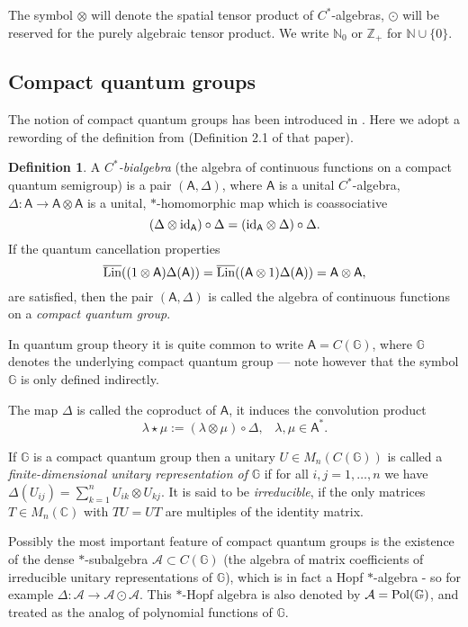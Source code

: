 \documentclass[12pt]{amsart}
\theoremstyle{definition}
\newtheorem{definition}[theorem]{Definition}
\theoremstyle{remark}
\numberwithin{equation}{section}
\begin{document}
The symbol $\otimes$ will denote the spatial tensor product of $C^*$-algebras,  $\odot$ will be reserved for the
purely algebraic tensor product. We write $\mathbb{N}_0$ or $\mathbb{Z}_+$ for $\mathbb{N}\cup \{0\}$.

\subsection{Compact quantum groups}

The notion of compact quantum groups has been introduced in \cite{woronowicz87}. Here we adopt a rewording of the 
definition from \cite{woronowicz98} (Definition 2.1 of that paper).

\begin{definition}
A \emph{$C^*$-bialgebra} (the algebra of continuous functions on a compact quantum semigroup) is a pair $(\mathsf{A}, \Delta)$, where
$\mathsf{A}$ is a unital $C^*$-algebra,
 $\Delta:\mathsf{A} \to \mathsf{A} \otimes \mathsf{A}$ is a unital,
 $*$-homomorphic map which is coassociative
\[ (\Delta \otimes \textup{id}_{\mathsf{A}})\circ \Delta = (\textup{id}_{\mathsf{A}} \otimes \Delta)
\circ\Delta.
\]
If the quantum cancellation properties
\[
\overline{{\rm Lin}}((1\otimes \mathsf{A})\Delta(\mathsf{A}) ) = \overline{{\rm Lin}}((\mathsf{A} \otimes 1)\Delta(\mathsf{A}) )
= \mathsf{A} \otimes \mathsf{A},
\]
are satisfied, then the pair $(\mathsf{A}, \Delta)$ is called the algebra of continuous functions on a \emph{compact
  quantum group}.
\end{definition}

In quantum group theory it is quite common to write
$\mathsf{A}=C(\mathbb{G})$, where $\mathbb{G}$ denotes the underlying compact quantum group --- note
however that the symbol $\mathbb{G}$ is only defined indirectly.

The map $\Delta$ is called the coproduct of $\mathsf{A}$, it induces the convolution product
\[\lambda\star \mu:=(\lambda\otimes \mu)\circ\Delta, \;\;\; \lambda,\mu\in\mathsf{A}^*.\]

If ${\mathbb{G}}$ is a compact quantum group then a unitary $U \in M_n(C({\mathbb{G}}))$ is called a {\emph{finite-dimensional 
unitary representation of}} $\mathbb{G}$ if for all $i,j=1,\ldots,n$ we have $\Delta(U_{ij}) = \sum_{k=1}^n 
U_{ik} \otimes U_{kj}$.  It is said to be \emph{irreducible}, if the only matrices $T\in M_n(\mathbb{C})$ with 
$TU=UT$ are multiples of the identity matrix.

Possibly the most important feature of compact quantum groups is the existence of the dense $*$-subalgebra $\mathcal{A}\subset C({\mathbb{G}})$
(the algebra of matrix coefficients of irreducible unitary representations of ${\mathbb{G}}$), which is in fact a Hopf
$*$-algebra - so for example $\Delta: \mathcal{A} \to \mathcal{A} \odot
\mathcal{A}$. This $*$-Hopf algebra is also denoted by $\mathcal{A}={{\rm
  Pol}(\mathbb{G})}$, and treated as the analog of polynomial functions of
$\mathbb{G}$.
\end{document}
